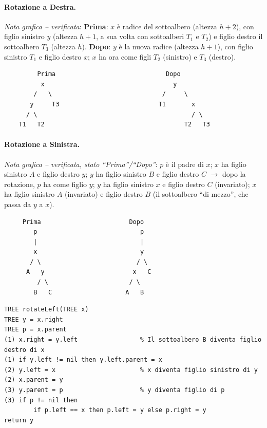 \documentclass[12pt, a4paper]{article}
\begin{document}
\paragraph{Rotazione a Destra.}

\textit{Nota grafica -- verificata}: \textbf{Prima}: $x$ è radice del sottoalbero (altezza $h+2$), con figlio sinistro $y$ (altezza $h+1$, a sua volta con sottoalberi $T_1$ e $T_2$) e figlio destro il sottoalbero $T_3$ (altezza $h$). \textbf{Dopo}: $y$ è la nuova radice (altezza $h+1$), con figlio sinistro $T_1$ e figlio destro $x$; $x$ ha ora come figli $T_2$ (sinistro) e $T_3$ (destro).

\begin{verbatim}
         Prima                              Dopo
          x                                   y
        /   \                              /     \
       y     T3                           T1       x
      / \                                          / \
    T1   T2                                      T2   T3
\end{verbatim}

\paragraph{Rotazione a Sinistra.}

\textit{Nota grafica -- verificata, stato ``Prima''/``Dopo''}: $p$ è il padre di $x$; $x$ ha figlio sinistro $A$ e figlio destro $y$; $y$ ha figlio sinistro $B$ e figlio destro $C$ $\to$ dopo la rotazione, $p$ ha come figlio $y$; $y$ ha figlio sinistro $x$ e figlio destro $C$ (invariato); $x$ ha figlio sinistro $A$ (invariato) e figlio destro $B$ (il sottoalbero ``di mezzo'', che passa da $y$ a $x$).

\begin{verbatim}
     Prima                        Dopo
        p                            p
        |                            |
        x                            y
       / \                          / \
      A   y                        x   C
         / \                      / \
        B   C                    A   B
\end{verbatim}

\begin{verbatim}
TREE rotateLeft(TREE x)
TREE y = x.right
TREE p = x.parent
(1) x.right = y.left                 % Il sottoalbero B diventa figlio destro di x
(1) if y.left != nil then y.left.parent = x
(2) y.left = x                       % x diventa figlio sinistro di y
(2) x.parent = y
(3) y.parent = p                     % y diventa figlio di p
(3) if p != nil then
        if p.left == x then p.left = y else p.right = y
return y
\end{verbatim}
\end{document}
